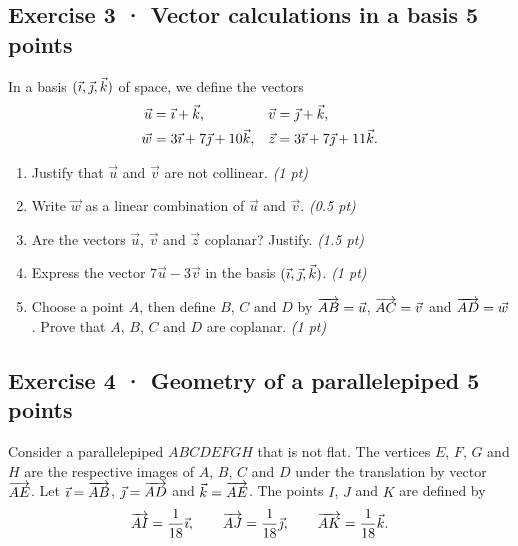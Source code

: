 \clearpage{}\par

\subsection*{Exercise 3 · Vector calculations in a basis \hfill 5 points}In a basis $(\vec{\imath},\vec{\jmath},\vec k)$ of space, we define the vectors
\[\begin{aligned}\vec u&=\vec{\imath}+\vec k,&\vec v&=\vec{\jmath}+\vec k,\\
\vec w&=3\vec{\imath}+7\vec{\jmath}+10\vec k,&\vec z&=3\vec{\imath}+7\vec{\jmath}+11\vec k.\end{aligned}\]

\begin{enumerate}

\item Justify that $\vec u$ and $\vec v$ are not collinear. \hfill\textit{(1 pt)}

\item Write $\vec w$ as a linear combination of $\vec u$ and $\vec v$. \hfill\textit{(0.5 pt)}

\item Are the vectors $\vec u$, $\vec v$ and $\vec z$ coplanar? Justify. \hfill\textit{(1.5 pt)}

\item Express the vector $7\vec u-3\vec v$ in the basis $(\vec{\imath},\vec{\jmath},\vec k)$. \hfill\textit{(1 pt)}

\item Choose a point $A$, then define $B$, $C$ and $D$ by $\overrightarrow{AB}=\vec u$, $\overrightarrow{AC}=\vec v$ and $\overrightarrow{AD}=\vec w$. Prove that $A$, $B$, $C$ and $D$ are coplanar. \hfill\textit{(1 pt)}

\end{enumerate}

\subsection*{Exercise 4 · Geometry of a parallelepiped \hfill 5 points}Consider a parallelepiped $ABCDEFGH$ that is not flat. The vertices $E$, $F$, $G$ and $H$ are the respective images of $A$, $B$, $C$ and $D$ under the translation by vector $\overrightarrow{AE}$.
Let $\vec{\imath}=\overrightarrow{AB}$, $\vec{\jmath}=\overrightarrow{AD}$ and $\vec k=\overrightarrow{AE}$.
The points $I$, $J$ and $K$ are defined by
\[\overrightarrow{AI}=\frac1{18}\vec{\imath},\qquad\overrightarrow{AJ}=\frac1{18}\vec{\jmath},\qquad\overrightarrow{AK}=\frac1{18}\vec k.\]

